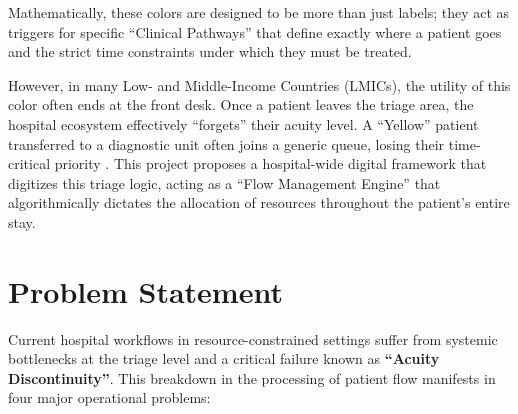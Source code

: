 \documentclass[12pt, a4paper]{article}
\begin{document}
	Mathematically, these colors are designed to be more than just labels; they act as triggers for specific ``Clinical Pathways'' that define exactly where a patient goes and the strict time constraints under which they must be treated. 
	
	However, in many Low- and Middle-Income Countries (LMICs), the utility of this color often ends at the front desk. Once a patient leaves the triage area, the hospital ecosystem effectively ``forgets'' their acuity level. A ``Yellow'' patient transferred to a diagnostic unit often joins a generic queue, losing their time-critical priority \cite{mitchell2023}. This project proposes a hospital-wide digital framework that digitizes this triage logic, acting as a ``Flow Management Engine'' that algorithmically dictates the allocation of resources throughout the patient's entire stay.
	
	\section{Problem Statement}
	Current hospital workflows in resource-constrained settings suffer from systemic bottlenecks at the triage level and a critical failure known as \textbf{``Acuity Discontinuity''}. This breakdown in the processing of patient flow manifests in four major operational problems:
	
\end{document}
